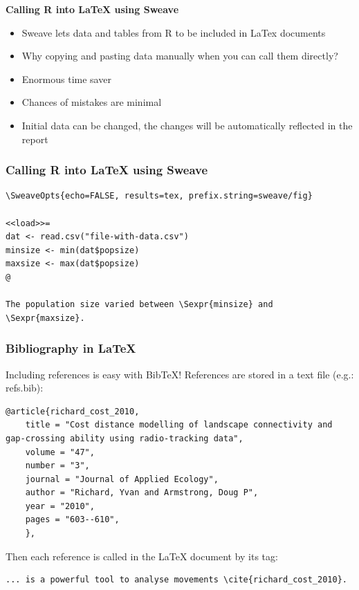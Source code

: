 \documentclass[9pt,xcolor=pdftex,dvipsnames,table]{beamer}
\begin{document}
\begin{frame}{\textbf{Calling R into LaTeX using Sweave}}
  \begin{itemize}
  \item Sweave lets data and tables from R to be included in LaTex documents
  \item Why copying and pasting data manually when you can call them directly?
  \item Enormous time saver
  \item Chances of mistakes are minimal
  \item Initial data can be changed, the changes will be automatically
    reflected in the report 
  \end{itemize}
\end{frame}


\begin{frame}[fragile] %
\frametitle{\textbf{Calling R into LaTeX using Sweave}}
\begin{example}[]
\begin{verbatim}
\SweaveOpts{echo=FALSE, results=tex, prefix.string=sweave/fig}

<<load>>=
dat <- read.csv("file-with-data.csv")
minsize <- min(dat$popsize)
maxsize <- max(dat$popsize)
@ 

The population size varied between \Sexpr{minsize} and \Sexpr{maxsize}.
\end{verbatim}
\end{example}
\end{frame}


\begin{frame}[fragile] %
\frametitle{\textbf{Bibliography in LaTeX}}
Including references is easy with BibTeX!
References are stored in a text file (e.g.: refs.bib):
\begin{verbatim}
@article{richard_cost_2010,
    title = "Cost distance modelling of landscape connectivity and gap-crossing ability using radio-tracking data",
    volume = "47",
    number = "3",
    journal = "Journal of Applied Ecology",
    author = "Richard, Yvan and Armstrong, Doug P",
    year = "2010",
    pages = "603--610",
    },
\end{verbatim}
Then each reference is called in the LaTeX document by its tag:
\begin{verbatim}
... is a powerful tool to analyse movements \cite{richard_cost_2010}.
\end{verbatim}
\end{frame}
\end{document}

